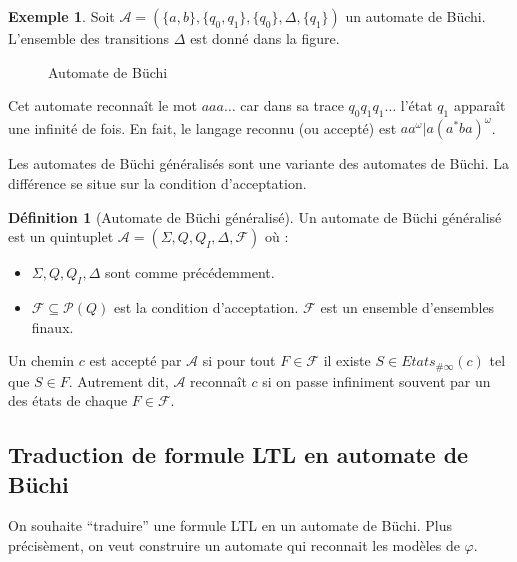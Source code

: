 \documentclass[12pt,a4paper]{article}
\theoremstyle{plain}
\theoremstyle{definition}
\newtheorem{defi}{Définition}
\newtheorem{ex}{Exemple}
\begin{document}
\begin{ex}
  Soit $\mathcal{A}=(\{a,b\}, \{q_0, q_1\}, \{q_0\}, \Delta, \{q_1\})$ un automate de Büchi.
  L'ensemble des transitions $\Delta$ est donné dans la figure.
  \begin{figure}[h]
    \centering
    \caption{Automate de Büchi}
  \end{figure}
  
  Cet automate reconnaît le mot $aaa\dots$ car dans sa trace $q_0q_1q_1\dots$ l'état $q_1$ apparaît une infinité de fois.
  En fait, le langage reconnu (ou accepté) est $aa^\omega | a(a^*ba)^\omega$.
\end{ex}

Les automates de Büchi généralisés sont une variante des automates de Büchi.
La différence se situe sur la condition d'acceptation.
\begin{defi}[Automate de Büchi généralisé]
Un automate de Büchi généralisé est un quintuplet $\mathcal{A}=(\Sigma, Q, Q_I, \Delta, \mathcal{F})$ où :
  \begin{itemize}
  \item $\Sigma, Q, Q_I, \Delta$ sont comme précédemment.
  \item $\mathcal{F} \subseteq \mathcal{P}(Q)$ est la condition d'acceptation.
    $\mathcal{F}$ est un ensemble d'ensembles finaux.
  \end{itemize}

  Un chemin $c$ est accepté par $\mathcal{A}$ si pour tout $F \in \mathcal{F}$ il existe $S \in Etats_{\#\infty}(c)$ tel que $S \in F$.
  Autrement dit, $\mathcal{A}$ reconnaît $c$ si on passe infiniment souvent par un des états de chaque $F \in \mathcal{F}$.
\end{defi}

\subsection{Traduction de formule LTL en automate de Büchi}
On souhaite ``traduire'' une formule LTL en un automate de Büchi. Plus précisèment, on veut construire un automate qui reconnait les modèles de $\varphi$.
\end{document}
